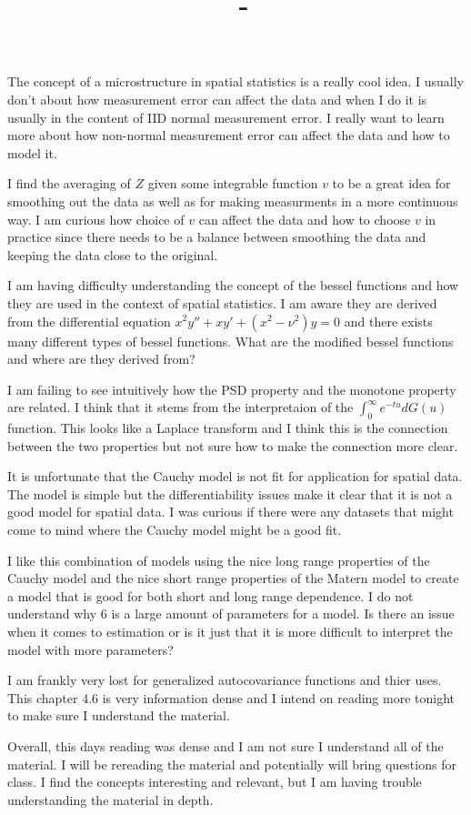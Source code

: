 \documentclass[answers,12pt,addpoints]{exam}
\author{\name}
\title{\course \ - \assignment}
\begin{document}
\maketitle

\begin{questions}
\question The concept of a microstructure in spatial statistics is a really cool idea. I usually don't about how measurement error can affect the data and when I do it is usually in the content of IID normal measurement error. I really want to learn more about how non-normal measurement error can affect the data and how to model it. 

\question I find the averaging of $Z$ given some integrable function $v$ to be a great idea for smoothing out the data as well as for making measurments in a more continuous way. I am curious how choice of $v$ can affect the data and how to choose $v$ in practice since there needs to be a balance between smoothing the data and keeping the data close to the original.

\question I am having difficulty understanding the concept of the bessel functions and how they are used in the context of spatial statistics. I am aware they are derived from the differential equation $x^2y'' + xy' + (x^2 - \nu^2)y = 0$ and there exists many different types of bessel functions. What are the modified bessel functions and where are they derived from? 

\question I am failing to see intuitively how the PSD property and the monotone property are related. I think that it stems from the interpretaion of the $\int_0^\infty e^{-tu}dG(u)$ function. This looks like a Laplace transform and I think this is the connection between the two properties but not sure how to make the connection more clear.

\question It is unfortunate that the Cauchy model is not fit for application for spatial data. The model is simple but the differentiability issues make it clear that it is not a good model for spatial data. I was curious if there were any datasets that might come to mind where the Cauchy model might be a good fit.

\question I like this combination of models using the nice long range properties of the Cauchy model and the nice short range properties of the Matern model to create a model that is good for both short and long range dependence. I do not understand why 6 is a large amount of parameters for a model. Is there an issue when it comes to estimation or is it just that it is more difficult to interpret the model with more parameters?

\question I am frankly very lost for generalized autocovariance functions and thier uses. This chapter 4.6 is very information dense and I intend on reading more tonight to make sure I understand the material. 

\question Overall, this days reading was dense and I am not sure I understand all of the material. I will be rereading the material and potentially will bring questions for class. I find the concepts interesting and relevant, but I am having trouble understanding the material in depth. 

\end{questions}
\end{document}
